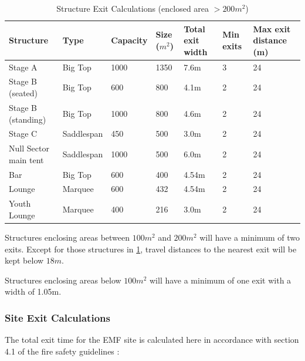 \begin{table}[h!]
    \caption{Structure Exit Calculations (enclosed area $>200m^2$)}
    \label{table:exit}
    \centering
    \begin{tabular}{| l | l | l | l | p{2cm} | l | p{2.1cm} |}
        \hline
        \textbf{Structure}        & \textbf{Type}      & \textbf{Capacity}              & \textbf{Size ($m^2$)} &
        \textbf{Total exit width} & \textbf{Min exits} & \textbf{Max exit distance (m)}                                          \\ \hline
        Stage A                   & Big Top            & 1000                           & 1350                  & 7.6m  & 3 & 24 \\
        Stage B (seated)          & Big Top            & 600                            & 800                   & 4.1m  & 2 & 24 \\
        Stage B (standing)        & Big Top            & 1000                           & 800                   & 4.6m  & 2 & 24 \\
        Stage C                   & Saddlespan         & 450                            & 500                   & 3.0m  & 2 & 24 \\
        Null Sector main tent     & Saddlespan         & 1000                           & 500                   & 6.0m  & 2 & 24 \\
        Bar                       & Big Top            & 600                            & 400                   & 4.54m & 2 & 24 \\
        Lounge                    & Marquee            & 600                            & 432                   & 4.54m & 2 & 24 \\
        Youth Lounge              & Marquee            & 400                            & 216                   & 3.0m  & 2 & 24 \\
        \hline
    \end{tabular}
\end{table}

Structures enclosing areas between $100m^2$ and $200m^2$ will have a minimum of two exits. Except
for those structures in \cref{table:exit}, travel distances to the nearest exit will be kept below $18m$.

Structures enclosing areas below $100m^2$ will have a minimum of one exit with a width of 1.05m.

\subsubsection{Site Exit Calculations}
The total exit time for the EMF site is calculated here in accordance with section 4.1 of the fire safety
guidelines \cite{firesafety}:

